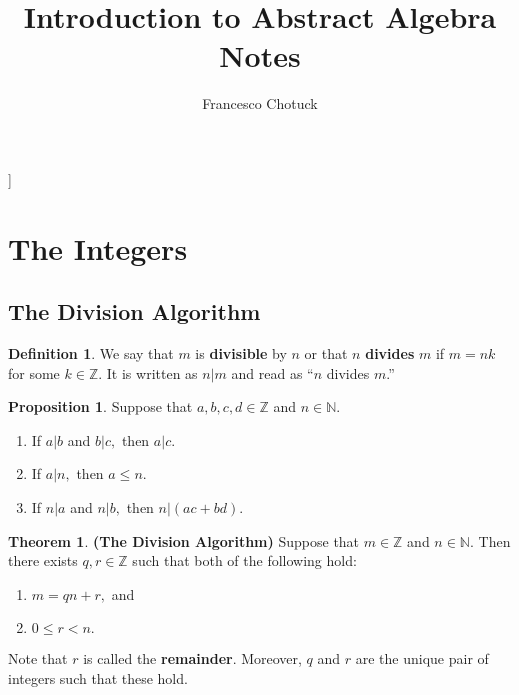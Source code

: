\documentclass[12pt, a4paper]{article}
\title{Introduction to Abstract Algebra Notes}
\date{}
\author{Francesco Chotuck}
\newcommand{\bb}[1]{\mathbb{#1}}
\theoremstyle{definition}
\newtheorem{definition}{Definition}[section]
\newtheorem{theorem}{Theorem}[section]
\newtheorem{proposition}{Proposition}
\theoremstyle{plain}
\begin{document}
 
\maketitle 
]
\tableofcontents

\pagebreak

\section{The Integers}

\subsection{The Division Algorithm}

\begin{definition}
We say that $m$ is \textbf{divisible} by $n$ or that $n$ \textbf{divides} $m$ if $m=nk$ for some $k \in \bb{Z}.$ It is written as $n|m$ and read as ``$n$ divides $m$.'' 
\end{definition}

\begin{proposition}
Suppose that $a,b,c,d \in \bb{Z}$ and $n\in \bb{N}.$
\begin{enumerate}
	
	\item If $a|b$ and $b|c,$ then $a|c.$

	\item If $a|n,$ then $a\leq n.$

	\item If $n|a$ and $n|b,$ then $n|(ac+bd).$

\end{enumerate}
\end{proposition}

\begin{theorem}\textbf{(The Division Algorithm)}
Suppose that $m\in \bb{Z}$ and $n\in\bb{N}.$ Then there exists $q,r \in \bb{Z}$ such that both of the following hold:
\begin{enumerate}
	
	\item $m=qn+r,$ and 

	\item $0\leq r<n.$

\end{enumerate}

Note that $r$ is called the \textbf{remainder}. Moreover, $q$ and $r$ are the unique pair of integers such that these hold.
\end{theorem}
\end{document}
